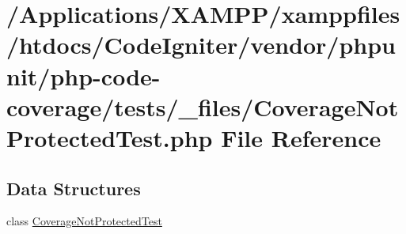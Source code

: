 \hypertarget{php-code-coverage_2tests_2__files_2_coverage_not_protected_test_8php}{}\section{/\+Applications/\+X\+A\+M\+P\+P/xamppfiles/htdocs/\+Code\+Igniter/vendor/phpunit/php-\/code-\/coverage/tests/\+\_\+files/\+Coverage\+Not\+Protected\+Test.php File Reference}
\label{php-code-coverage_2tests_2__files_2_coverage_not_protected_test_8php}
\subsection*{Data Structures}
\begin{DoxyCompactItemize}
\item 
class \mbox{\hyperlink{class_coverage_not_protected_test}{Coverage\+Not\+Protected\+Test}}
\end{DoxyCompactItemize}

